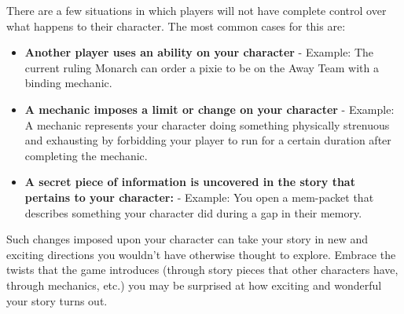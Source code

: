 \documentclass[sheet]{PP}
\begin{document}
There are a few situations in which players will not have complete control over what happens to their character. The most common cases for this are:
\begin{itemize}
	\item \textbf{Another player uses an ability on your character} - Example: The current ruling Monarch can order a pixie to be on the Away Team with a binding mechanic. 
	\item \textbf{A mechanic imposes a limit or change on your character} - Example:  A mechanic represents your character doing something physically strenuous and exhausting by forbidding your player to run for a certain duration after completing the mechanic.
	\item \textbf{A secret piece of information is uncovered in the story that pertains to your character:} - Example: You open a mem-packet that describes something your character did during a gap in their memory.
\end{itemize}	

Such changes imposed upon your character can take your story in new and exciting directions you wouldn’t have otherwise thought to explore. Embrace the twists that the game introduces (through story pieces that other characters have, through mechanics, etc.) you may be surprised at how exciting and wonderful your story turns out.
\end{document}
